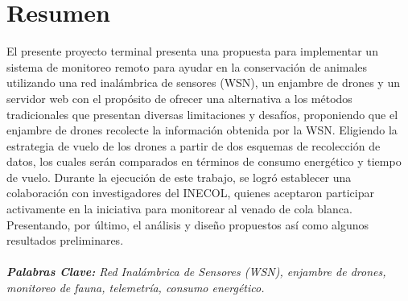 \chapter{Resumen}
El presente proyecto terminal presenta una propuesta para implementar un sistema de monitoreo remoto para ayudar en la conservación de animales utilizando una red inalámbrica de sensores  (WSN), un enjambre de drones y un servidor web con el propósito de ofrecer una alternativa a los métodos tradicionales que presentan diversas limitaciones y desafíos, proponiendo que el enjambre de drones recolecte la información obtenida por la WSN. Eligiendo la estrategia de vuelo de los drones a partir de dos esquemas de recolección de datos, los cuales serán comparados en términos de consumo energético y tiempo de vuelo. Durante la ejecución de este trabajo, se logró establecer una colaboración con investigadores del INECOL, quienes aceptaron participar activamente en la iniciativa para monitorear al venado de cola blanca. Presentando, por último, el análisis y diseño propuestos así como algunos resultados preliminares.
\\ \\
\noindent \textit{\textbf{Palabras Clave:} Red Inalámbrica de Sensores (WSN), enjambre de drones, monitoreo de fauna, telemetría, consumo energético.}  \\




\endinput 